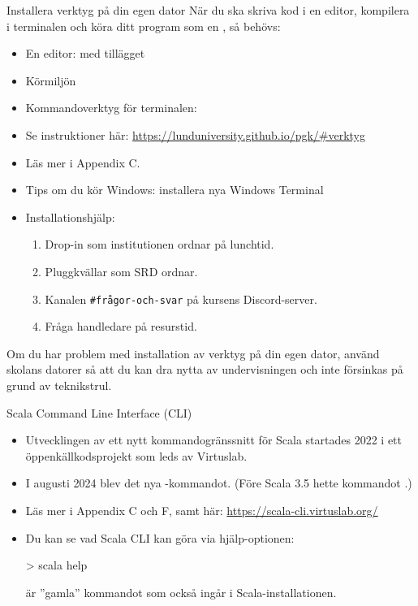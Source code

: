 \begin{Slide}{Installera verktyg på din egen dator}
  \SlideFontSmall
  När du ska skriva kod i en editor, kompilera i terminalen och köra ditt program som en , så behövs: 
  \begin{itemize}\SlideFontSmall
    \item En editor:  med tillägget 
    \item Körmiljön  
    \item Kommandoverktyg för terminalen: 
    \item Se instruktioner här: \url{https://lunduniversity.github.io/pgk/#verktyg}
    \item Läs mer i Appendix C.
    \item Tips om du kör Windows: installera %
    {nya Windows Terminal}

    \item Installationshjälp:
    \begin{enumerate}\SlideFontTiny
      \item Drop-in som institutionen ordnar på lunchtid.
      \item Pluggkvällar som SRD ordnar.
      \item Kanalen \texttt{\#frågor-och-svar} på kursens Discord-server.
      \item Fråga handledare på resurstid.
    \end{enumerate}
    
  \end{itemize}
\ifkompendium
Om du har problem med installation av verktyg på din egen dator, använd skolans datorer så att du kan dra nytta av undervisningen och inte försinkas på grund av teknikstrul. 
\fi
\end{Slide}

\begin{Slide}{Scala Command Line Interface (CLI)}
\begin{itemize}
\item Utvecklingen av ett nytt kommandogränssnitt  för Scala startades 2022 i ett öppenkällkodsprojekt som leds av Virtuslab. 
\item I augusti 2024 blev  det nya -kommandot. (Före Scala 3.5 hette kommandot .)
\item Läs mer i Appendix C och F, samt här: \url{https://scala-cli.virtuslab.org/}
\item Du kan se vad Scala CLI kan göra via hjälp-optionen:
\begin{REPLnonum}
> scala help
\end{REPLnonum}
{\SlideFontTiny {} är ''gamla'' kommandot som också ingår i Scala-installationen.}
\end{itemize}
\end{Slide}



